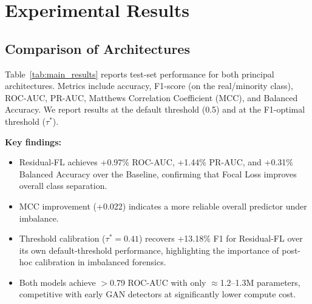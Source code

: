 \documentclass[10pt,twocolumn]{article}
\begin{document}
\section{Experimental Results}
\label{sec:results}

\subsection{Comparison of Architectures}

Table~\ref{tab:main_results} reports test-set performance for both principal
architectures. Metrics include accuracy, F1-score (on the real/minority class),
ROC-AUC, PR-AUC, Matthews Correlation Coefficient (MCC), and Balanced Accuracy.
We report results at the default threshold (0.5) and at the F1-optimal threshold
($\tau^*$).

\begin{table}[h]
\centering
\caption{Test-set performance. $\tau^*$ denotes F1-optimal threshold.
$\uparrow$: higher is better.}
\label{tab:main_results}
\end{table}

\noindent\textbf{Key findings:}
\begin{itemize}[leftmargin=1.2em, itemsep=1pt]
  \item Residual-FL achieves +0.97\% ROC-AUC, +1.44\% PR-AUC, and +0.31\%
  Balanced Accuracy over the Baseline, confirming that Focal Loss improves
  overall class separation.
  \item MCC improvement (+0.022) indicates a more reliable overall predictor
  under imbalance.
  \item Threshold calibration ($\tau^*{=}0.41$) recovers +13.18\% F1 for
  Residual-FL over its own default-threshold performance, highlighting the
  importance of post-hoc calibration in imbalanced forensics.
  \item Both models achieve $>$0.79 ROC-AUC with only $\approx$1.2--1.3M
  parameters, competitive with early GAN detectors at significantly lower
  compute cost.
\end{itemize}
\end{document}
